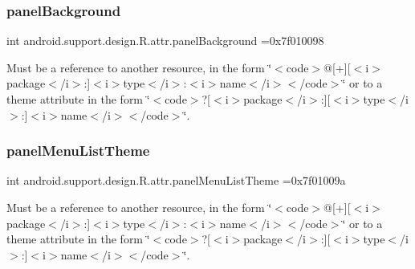 \subsubsection{\texorpdfstring{panel\+Background}{panelBackground}}
{\footnotesize\ttfamily int android.\+support.\+design.\+R.\+attr.\+panel\+Background =0x7f010098\hspace{0.3cm}{\ttfamily [static]}}

Must be a reference to another resource, in the form \char`\"{}$<$code$>$@\mbox{[}+\mbox{]}\mbox{[}$<$i$>$package$<$/i$>$\+:\mbox{]}$<$i$>$type$<$/i$>$\+:$<$i$>$name$<$/i$>$$<$/code$>$\char`\"{} or to a theme attribute in the form \char`\"{}$<$code$>$?\mbox{[}$<$i$>$package$<$/i$>$\+:\mbox{]}\mbox{[}$<$i$>$type$<$/i$>$\+:\mbox{]}$<$i$>$name$<$/i$>$$<$/code$>$\char`\"{}. \mbox{\label{classandroid_1_1support_1_1design_1_1R_1_1attr_a3d266bd169b6d7779a9f6d6bd66d28b2}} 
\subsubsection{\texorpdfstring{panel\+Menu\+List\+Theme}{panelMenuListTheme}}
{\footnotesize\ttfamily int android.\+support.\+design.\+R.\+attr.\+panel\+Menu\+List\+Theme =0x7f01009a\hspace{0.3cm}{\ttfamily [static]}}

Must be a reference to another resource, in the form \char`\"{}$<$code$>$@\mbox{[}+\mbox{]}\mbox{[}$<$i$>$package$<$/i$>$\+:\mbox{]}$<$i$>$type$<$/i$>$\+:$<$i$>$name$<$/i$>$$<$/code$>$\char`\"{} or to a theme attribute in the form \char`\"{}$<$code$>$?\mbox{[}$<$i$>$package$<$/i$>$\+:\mbox{]}\mbox{[}$<$i$>$type$<$/i$>$\+:\mbox{]}$<$i$>$name$<$/i$>$$<$/code$>$\char`\"{}. \mbox{\label{classandroid_1_1support_1_1design_1_1R_1_1attr_ae2b662feeb9262657fe25b197684e764}} 
